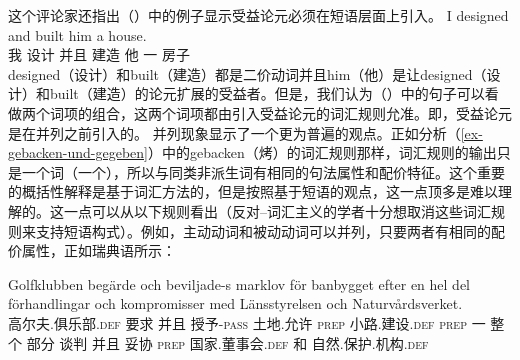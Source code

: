     这个评论家还指出（）中的例子显示受益论元必须在短语层面上引入。
\ea
\gll I designed and built him a house.\\
     我  设计 并且 建造 他 一 房子\\
\z
designed（设计）和built（建造）都是二价动词并且him（他）是让designed（设计）和built（建造）的论元扩展的受益者。但是，我们认为（）中的句子可以看做两个词项的组合，这两个词项都由引入受益论元的词汇规则允准。即，受益论元是在并列之前引入的。
    并列现象显示了一个更为普遍的观点。正如分析（\ref{ex-gebacken-und-gegeben}）中的gebacken（烤）的词汇规则那样，词汇规则的输出只是一个词（一个\xzeroc），所以与同类非派生词有相同的句法属性和配价特征。这个重要的概括性解释是基于词汇方法的，但是按照基于短语的观点，这一点顶多是难以理解的。这一点可以从以下规则看出（反对--词汇主义的学者十分想取消这些词汇规则来支持短语构式）。例如，主动动词和被动动词可以并列，只要两者有相同的配价属性，正如瑞典语所示：
\ea
{\raggedright
\gll Golfklubben beg\"arde och beviljade-s marklov f\"or banbygget efter en hel del f\"orhandlingar och kompromisser med L\"ansstyrelsen och 
Naturv\aa rdsverket.\footnotemark\\
高尔夫.俱乐部.\textsc{def} 要求 并且 授予-\textsc{pass} 土地.允许 \textsc{prep} 小路.建设.\textsc{def} \textsc{prep} 一 整个 部分 谈判 并且 妥协 \textsc{prep} 国家.董事会.\textsc{def} 和 自然.保护.机构.\textsc{def} \\
\par}
